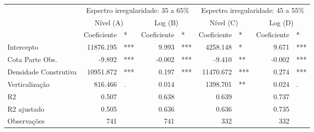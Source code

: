 \begingroup
\fontsize{9.0pt}{10.8pt}\selectfont
\begin{longtable}{lrlrlrlrl}
\toprule
 & \multicolumn{4}{c}{Espectro irregularidade: 35 a 65\%} & \multicolumn{4}{c}{Espectro irregularidade: 45 a 55\%} \\ 
\cmidrule(lr){2-5} \cmidrule(lr){6-9}
 & \multicolumn{2}{c}{Nível (A)    } & \multicolumn{2}{c}{Log (B)    } & \multicolumn{2}{c}{Nível (C)    } & \multicolumn{2}{c}{Log (D)    } \\ 
\cmidrule(lr){2-3} \cmidrule(lr){4-5} \cmidrule(lr){6-7} \cmidrule(lr){8-9}
  & Coeficiente & * & Coeficiente  & *  & Coeficiente   & *   & Coeficiente    & *    \\ 
\midrule\addlinespace[2.5pt]
Intercepto & 11876.195 & *** & 9.993 & *** & 4258.148 & * & 9.671 & *** \\ 
Cota Parte Obs. & -9.892 & *** & -0.002 & *** & -9.410 & ** & -0.002 & *** \\ 
Densidade Construtiva & 10951.872 & *** & 0.197 & *** & 11470.672 & *** & 0.274 & *** \\ 
Verticalização & 816.466 & . & 0.014 &  & 1398.701 & ** & 0.024 & . \\ 
\midrule\addlinespace[2.5pt]

{R2} & {0.507} & {} & {0.638} & {} & {0.639} & {} & {0.737} & {} \\ 
R2 ajustado & 0.505 &  & 0.636 &  & 0.636 &  & 0.735 &  \\ 
Observações & 741 &  & 741 &  & 332 &  & 332 &  \\ 
\bottomrule
\end{longtable}
\endgroup

